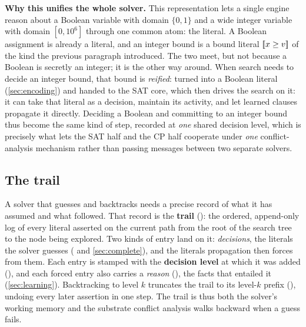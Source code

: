\textbf{Why this unifies the whole solver.} This representation lets a single
engine reason about a Boolean variable with domain $\{0,1\}$ and a wide integer
variable with domain $[0,10^6]$ through one common atom: the literal. A Boolean
assignment is already a literal, and an integer bound is a bound literal
$[\![x \ge v]\!]$ of the kind the previous paragraph introduced.
The two meet, but not because a Boolean is secretly an integer; it is the other
way around. When search needs to decide an integer bound, that bound is
\emph{reified}: turned into a Boolean literal (\cref{sec:encoding}) and handed to
the SAT core, which then drives the search on it: it can take that literal as a
decision, maintain its activity, and let learned clauses propagate it directly.
Deciding a Boolean and committing to an integer bound thus become the same kind
of step, recorded at \emph{one} shared decision level, which is precisely what
lets the SAT half and the CP half cooperate under \emph{one} conflict-analysis
mechanism rather than passing messages between two separate solvers.

\subsection{The trail}\label{sec:trail}

A solver that guesses and backtracks needs a precise record of what it has
assumed and what followed. That record is the \textbf{trail}
(): the ordered, append-only log of every literal
asserted on the current path from the root of the search tree to the node being
explored. Two kinds of entry land on it: \emph{decisions}, the literals the
solver guesses ( and
\cref{sec:complete}), and the literals propagation then forces from them.
Each entry is stamped with the \textbf{decision level} at which it was added
(), and each forced entry also carries a \emph{reason}
(), the facts that entailed it (\cref{sec:learning}).
Backtracking to level $k$ truncates the trail to its level-$k$ prefix
(), undoing every later assertion in one
step. The trail is thus both the solver's working memory and the substrate
conflict analysis walks backward when a guess fails.

